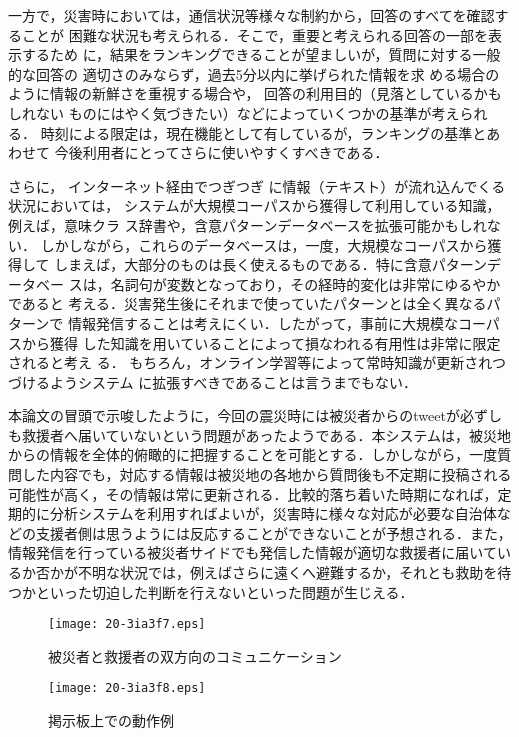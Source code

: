 \documentclass[japanese]{jnlp_1.4}
\begin{document}
一方で，災害時においては，通信状況等様々な制約から，回答のすべてを確認することが
困難な状況も考えられる．そこで，重要と考えられる回答の一部を表示するため
に，結果をランキングできることが望ましいが，質問に対する一般的な回答の
適切さのみならず，過去5分以内に挙げられた情報を求
める場合のように情報の新鮮さを重視する場合や，
回答の利用目的（見落としているかもしれない
ものにはやく気づきたい）などによっていくつかの基準が考えられる．
時刻による限定は，現在機能として有しているが，ランキングの基準とあわせて
今後利用者にとってさらに使いやすくすべきである．

さらに，
インターネット経由でつぎつぎ
に情報（テキスト）が流れ込んでくる状況においては，
システムが大規模コーパスから獲得して利用している知識，例えば，意味クラ
ス辞書や，含意パターンデータベースを拡張可能かもしれない．
しかしながら，これらのデータベースは，一度，大規模なコーパスから獲得して
しまえば，大部分のものは長く使えるものである．特に含意パターンデータベー
スは，名詞句が変数となっており，その経時的変化は非常にゆるやかであると
考える．災害発生後にそれまで使っていたパターンとは全く異なるパターンで
情報発信することは考えにくい．したがって，事前に大規模なコーパスから獲得
した知識を用いていることによって損なわれる有用性は非常に限定されると考え
る．
もちろん，オンライン学習等によって常時知識が更新されつづけるようシステム
に拡張すべきであることは言うまでもない．

本論文の冒頭で示唆したように，今回の震災時には被災者からのtweetが必ずし
も救援者へ届いていないという問題があったようである．本システムは，被災地
からの情報を全体的俯瞰的に把握することを可能とする．しかしながら，一度質
問した内容でも，対応する情報は被災地の各地から質問後も不定期に投稿される
可能性が高く，その情報は常に更新される．比較的落ち着いた時期になれば，定
期的に分析システムを利用すればよいが，災害時に様々な対応が必要な自治体な
どの支援者側は思うようには反応することができないことが予想される．また，
情報発信を行っている被災者サイドでも発信した情報が適切な救援者に届いてい
るか否かが不明な状況では，例えばさらに遠くへ避難するか，それとも救助を待
つかといった切迫した判断を行えないといった問題が生じえる．

\begin{figure}[b]
\begin{center}
\texttt{[image: 20-3ia3f7.eps]}
\end{center}
\caption{被災者と救援者の双方向のコミュニケーション}
\label{two-way-communication}
\end{figure}
\begin{figure}[b]
\begin{center}
\texttt{[image: 20-3ia3f8.eps]}
\end{center}
\caption{掲示板上での動作例}
\label{BBS-example}
\end{figure}
\end{document}

